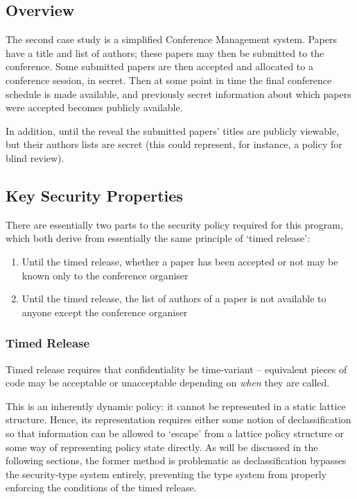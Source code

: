\newpage

\subsection{Overview}

The second case study is a simplified Conference Management system. Papers have a title and list of authors; these papers may then be submitted to the conference. Some submitted papers are then accepted and allocated to a conference session, in secret. Then at some point in time the final conference schedule is made available, and previously secret information about which papers were accepted becomes publicly available.

In addition, until the reveal the submitted papers' titles are publicly viewable, but their authors lists are secret (this could represent, for instance, a policy for blind review).

\subsection{Key Security Properties}

There are essentially two parts to the security policy required for this program, which both derive from essentially the same principle of `timed release':

\begin{enumerate}
	\item Until the timed release, whether a paper has been accepted or not may be known only to the conference organiser
	
	\item Until the timed release, the list of authors of a paper is not available to anyone except the conference organiser
\end{enumerate}

\subsubsection{Timed Release}

Timed release requires that confidentiality be time-variant -- equivalent pieces of code may be acceptable or unacceptable depending on \textit{when} they are called.

This is an inherently dynamic policy: it cannot be represented in a static lattice structure. Hence, its representation requires either some notion of declassification so that information can be allowed to `escape' from a lattice policy structure or some way of representing policy state directly. As will be discussed in the following sections, the former method is problematic as declassification bypasses the security-type system entirely, preventing the type system from properly enforcing the conditions of the timed release.

